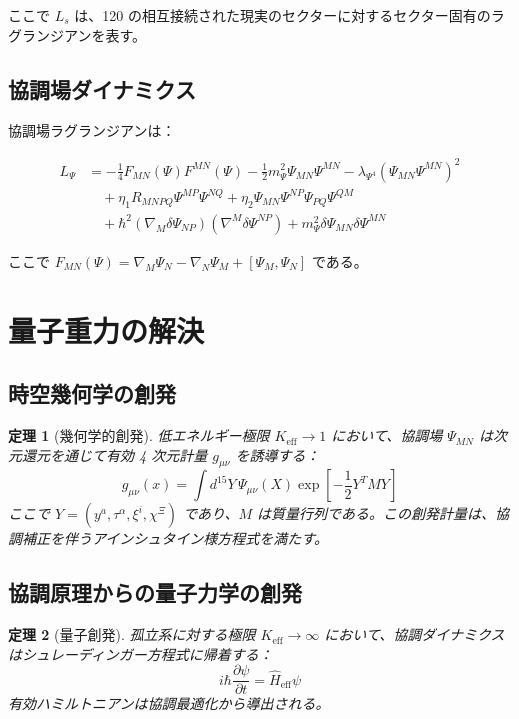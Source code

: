 \documentclass[11pt,a4paper]{article}
\newcommand{\eff}{\text{eff}}
\newtheorem{theorem}{定理}[section]
\theoremstyle{remark}
\newcommand{\Keff}{K_{\mathrm{eff}}}
\begin{document}
	ここで $L_s$ は、120 の相互接続された現実のセクターに対するセクター固有のラグランジアンを表す。
	
	\subsection{協調場ダイナミクス}
	
	協調場ラグランジアンは：
	
	\begin{equation}
		\begin{aligned}
			L_{\Psi} &= -\frac{1}{4} F_{MN}(\Psi) F^{MN}(\Psi)
			- \frac{1}{2} m_{\Psi}^2 \Psi_{MN} \Psi^{MN}
			- \lambda_{\Psi^4} (\Psi_{MN}\Psi^{MN})^2 \\
			&\quad + \eta_1 R_{MNPQ} \Psi^{MP} \Psi^{NQ}
			+ \eta_2 \Psi_{MN}\Psi^{NP}\Psi_{PQ}\Psi^{QM} \\
			&\quad + \hbar^2 (\nabla_M \delta\Psi_{NP})(\nabla^M \delta\Psi^{NP})
			+ m_{\Psi}^2 \delta\Psi_{MN}\delta\Psi^{MN}
		\end{aligned}
	\end{equation}
	
	ここで $F_{MN}(\Psi) = \nabla_M \Psi_N - \nabla_N \Psi_M + [\Psi_M, \Psi_N]$ である。
	
	\section{量子重力の解決}
	\label{sec:quantum-gravity-resolution}
	
	\subsection{時空幾何学の創発}
	
	\begin{theorem}[幾何学的創発]
		低エネルギー極限 $\Keff \to 1$ において、協調場 $\Psi_{MN}$ は次元還元を通じて有効 4 次元計量 $g_{\mu\nu}$ を誘導する：
		\[
		g_{\mu\nu}(x) = \int d^{15}Y \, \Psi_{\mu\nu}(X) \exp\left[-\frac{1}{2}Y^T M Y\right]
		\]
		ここで $Y = (y^a, \tau^\alpha, \xi^i, \chi^\Xi)$ であり、$M$ は質量行列である。この創発計量は、協調補正を伴うアインシュタイン様方程式を満たす。
	\end{theorem}
	
	\subsection{協調原理からの量子力学の創発}
	
	\begin{theorem}[量子創発]
		孤立系に対する極限 $\Keff \to \infty$ において、協調ダイナミクスはシュレーディンガー方程式に帰着する：
		\[
		i\hbar \frac{\partial \psi}{\partial t} = \hat{H}_{\eff} \psi
		\]
		有効ハミルトニアンは協調最適化から導出される。
	\end{theorem}
	
\end{document}
